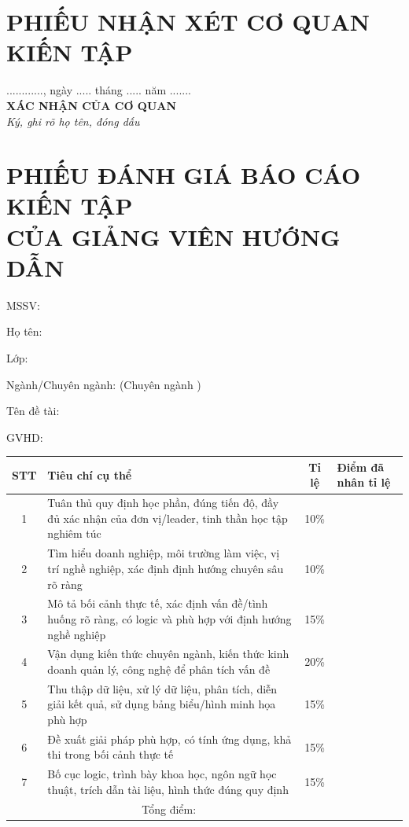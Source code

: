 \clearpage
\section*{PHIẾU NHẬN XÉT CƠ QUAN KIẾN TẬP}
\vspace{12pt}
\hfill\begin{minipage}{8cm}\centering
............, ngày ..... tháng ..... năm .......\\
\textbf{XÁC NHẬN CỦA CƠ QUAN}\\
\textit{Ký, ghi rõ họ tên, đóng dấu}
\end{minipage}

\clearpage
\section*{PHIẾU ĐÁNH GIÁ BÁO CÁO KIẾN TẬP\\ CỦA GIẢNG VIÊN HƯỚNG DẪN}
{\setlength{\parskip}{0pt}\singlespacing
MSSV: \mssv

Họ tên: \svth

Lớp: \lop

Ngành/Chuyên ngành: \tennganh{} (Chuyên ngành \tenchuyennganh)

Tên đề tài: \tendetai

GVHD: \gvhd
\par}
\vspace{6pt}
{\singlespacing\renewcommand{\arraystretch}{1.3}\noindent
\begin{tabularx}{\textwidth}{|c|>{\centering\arraybackslash}X|c|>{\centering\arraybackslash}p{2.2cm}|}\hline
\textbf{STT} & \textbf{Tiêu chí cụ thể} & \textbf{Tỉ lệ} & \textbf{Điểm đã nhân tỉ lệ} \\ \hline
1 & Tuân thủ quy định học phần, đúng tiến độ, đầy đủ xác nhận của đơn vị/leader, tinh thần học tập nghiêm túc & 10\% & \\ \hline
2 & Tìm hiểu doanh nghiệp, môi trường làm việc, vị trí nghề nghiệp, xác định định hướng chuyên sâu rõ ràng & 10\% & \\ \hline
3 & Mô tả bối cảnh thực tế, xác định vấn đề/tình huống rõ ràng, có logic và phù hợp với định hướng nghề nghiệp & 15\% & \\ \hline
4 & Vận dụng kiến thức chuyên ngành, kiến thức kinh doanh quản lý, công nghệ để phân tích vấn đề & 20\% & \\ \hline
5 & Thu thập dữ liệu, xử lý dữ liệu, phân tích, diễn giải kết quả, sử dụng bảng biểu/hình minh họa phù hợp & 15\% & \\ \hline
6 & Đề xuất giải pháp phù hợp, có tính ứng dụng, khả thi trong bối cảnh thực tế & 15\% & \\ \hline
7 & Bố cục logic, trình bày khoa học, ngôn ngữ học thuật, trích dẫn tài liệu, hình thức đúng quy định & 15\% & \\ \hline
\multicolumn{3}{|c|}{Tổng điểm:} & \\[12pt] \hline
\end{tabularx}}

